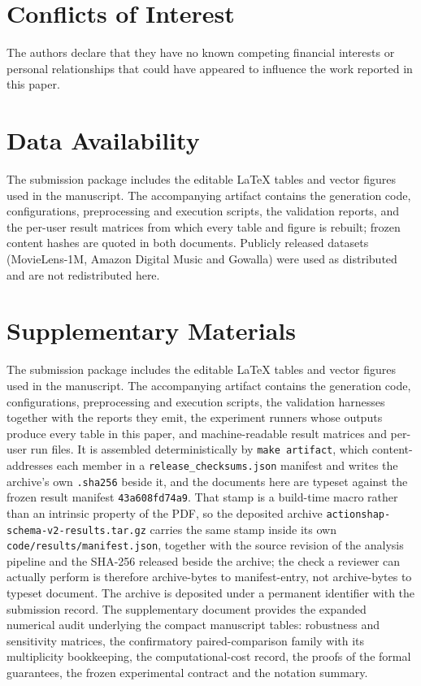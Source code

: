 \documentclass[manuscript,screen,review,anonymous]{acmart}
\newcommand{\resultmanifeststamp}{43a608fd74a9}
\begin{document}
\section{Conflicts of Interest}
The authors declare that they have no known competing financial interests or personal relationships that
could have appeared to influence the work reported in this paper.

\section{Data Availability}
The submission package includes the editable LaTeX tables and vector figures used in the manuscript. The
accompanying artifact contains the generation code, configurations, preprocessing and execution scripts,
the validation reports, and the per-user result matrices from which every table and figure is rebuilt;
frozen content hashes are quoted in both documents. Publicly released datasets (MovieLens-1M, Amazon
Digital Music and Gowalla) were used as distributed and are not redistributed here.

\section{Supplementary Materials}
The submission package includes the editable LaTeX tables and vector figures used in the manuscript. The accompanying artifact contains the generation code, configurations, preprocessing and execution scripts, the validation harnesses together with the reports they emit, the experiment runners whose outputs produce every table in this paper, and machine-readable result matrices and per-user run files. It is assembled deterministically by \texttt{make~artifact}, which content-addresses each member in a \texttt{release\_checksums.json} manifest and writes the archive's own \texttt{.sha256} beside it, and the documents here are typeset against the frozen result manifest \texttt{\resultmanifeststamp}. That stamp is a build-time macro rather than an intrinsic property of the PDF, so the deposited archive \texttt{actionshap-schema-v2-results.tar.gz} carries the same stamp inside its own \texttt{code/results/manifest.json}, together with the source revision of the analysis pipeline and the SHA-256 released beside the archive; the check a reviewer can actually perform is therefore archive-bytes to manifest-entry, not archive-bytes to typeset document. The archive is deposited under a permanent identifier with the submission record.
The supplementary document provides the expanded numerical audit underlying the compact manuscript
tables: robustness and sensitivity matrices, the confirmatory paired-comparison family with its
multiplicity bookkeeping, the computational-cost record, the proofs of the formal guarantees, the frozen
experimental contract and the notation summary.
\end{document}
